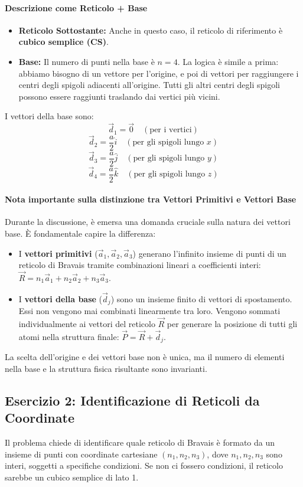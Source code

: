 \paragraph{Descrizione come Reticolo + Base}
\begin{itemize}
    \item \textbf{Reticolo Sottostante:} Anche in questo caso, il reticolo di riferimento è \textbf{cubico semplice (CS)}.
    \item \textbf{Base:} Il numero di punti nella base è $n=4$. La logica è simile a prima: abbiamo bisogno di un vettore per l'origine, e poi di vettori per raggiungere i centri degli spigoli adiacenti all'origine. Tutti gli altri centri degli spigoli possono essere raggiunti traslando dai vertici più vicini.
\end{itemize}
I vettori della base sono:
$$ \vec{d}_1 = \vec{0} \quad (\text{per i vertici}) $$
$$ \vec{d}_2 = \frac{a}{2}\hat{i} \quad (\text{per gli spigoli lungo } x) $$
$$ \vec{d}_3 = \frac{a}{2}\hat{j} \quad (\text{per gli spigoli lungo } y) $$
$$ \vec{d}_4 = \frac{a}{2}\hat{k} \quad (\text{per gli spigoli lungo } z) $$

\paragraph{Nota importante sulla distinzione tra Vettori Primitivi e Vettori Base}
Durante la discussione, è emersa una domanda cruciale sulla natura dei vettori base. È fondamentale capire la differenza:
\begin{itemize}
    \item I \textbf{vettori primitivi} ($\vec{a}_1, \vec{a}_2, \vec{a}_3$) generano l'infinito insieme di punti di un reticolo di Bravais tramite combinazioni lineari a coefficienti interi: $\vec{R} = n_1\vec{a}_1 + n_2\vec{a}_2 + n_3\vec{a}_3$.
    \item I \textbf{vettori della base} ($\vec{d}_j$) sono un insieme finito di vettori di spostamento. Essi non vengono mai combinati linearmente tra loro. Vengono sommati individualmente ai vettori del reticolo $\vec{R}$ per generare la posizione di tutti gli atomi nella struttura finale: $\vec{P} = \vec{R} + \vec{d}_j$.
\end{itemize}
La scelta dell'origine e dei vettori base non è unica, ma il numero di elementi nella base e la struttura fisica risultante sono invarianti.

\subsection{Esercizio 2: Identificazione di Reticoli da Coordinate}
Il problema chiede di identificare quale reticolo di Bravais è formato da un insieme di punti con coordinate cartesiane $(n_1, n_2, n_3)$, dove $n_1, n_2, n_3$ sono interi, soggetti a specifiche condizioni. Se non ci fossero condizioni, il reticolo sarebbe un cubico semplice di lato 1.


